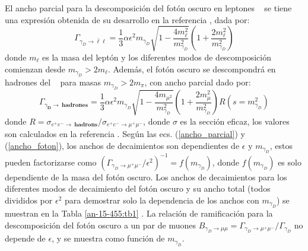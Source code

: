 El ancho parcial  para la descomposición del fotón oscuro en leptones \ME ~ se tiene una expresión obtenida de su desarrollo en la referencia \citep{foton_decae}, dada por:
\begin{equation}\label{ancho_parcial}
\Gamma_{\gamma_D \rightarrow \bar{\ell}\ell} = \dfrac{1}{3}\alpha \epsilon^2 m_{\gamma_D} \sqrt{1- \dfrac{4m_\ell^2}{m_{\gamma_D}^2}}
\left( 1 + \dfrac{2m_\ell^2}{m_{\gamma_D}^2}\right) 
\end{equation}
donde $m_\ell$ es la masa del leptón y los diferentes modos de descomposición comienzan desde $m_{\gamma_D} > 2 m_\ell$. Además, el fotón oscuro se descompondrá en hadrones del \ME ~ para masas $m_{\gamma_D} > 2 m_\pi$, con ancho parcial dado por:
\begin{equation}\label{ancho_foton}
\Gamma_{\gamma_\mathbf{D} \rightarrow ~ \mathbf{hadrones}}= \dfrac{1}{3} \alpha \epsilon^2 m_{\gamma_D} \sqrt{1 -\dfrac{4 m_{\mu^2}}{m_{\gamma_D}^2}} \left( 1 + \dfrac{2 m_\mu^2}{m_{\gamma_D}^2}\right) R(s = m_{\gamma_D}^2)
\end{equation}
donde $R = \sigma_{e^+ e^- \rightarrow ~ \mathbf{hadrons}} / \sigma_{e^+ e^- \rightarrow \mu^+ \mu^-}$, donde $\sigma$ es la sección eficaz, los valores son calculados en la referencia \cite{foton_decae}. %
Según las ecs. (\ref{ancho_parcial}) y (\ref{ancho_foton}), los anchos de decaimientos son dependientes de $\epsilon$ y $m_{\gamma_D}$, estos pueden factorizarse como $ (\Gamma_{\gamma_{D}{\rightarrow \mu^+\mu^-}}/\epsilon^2)^{-1}= f (m_{\gamma_D})$, donde $f (m_{\gamma_D})$ es solo dependiente de la masa del fotón oscuro. Los anchos de decaimientos para los diferentes modos de decaimiento del fotón oscuro y su ancho total (todos divididos por $\epsilon^2$ para demostrar solo la dependencia de los anchos con $m_{\gamma_D}$) se muestran en la Tabla \ref{an-15-455:tb1}%
. La relación de ramificación para la descomposición del fotón oscuro a un par de muones $B_{\gamma_D\rightarrow \mu\mu} = \Gamma_{\gamma_D\rightarrow \mu^+\mu^-} /\Gamma_{\gamma_D}$ no depende de $\epsilon$, y se muestra %
como función de $m_{\gamma_D}$. %

